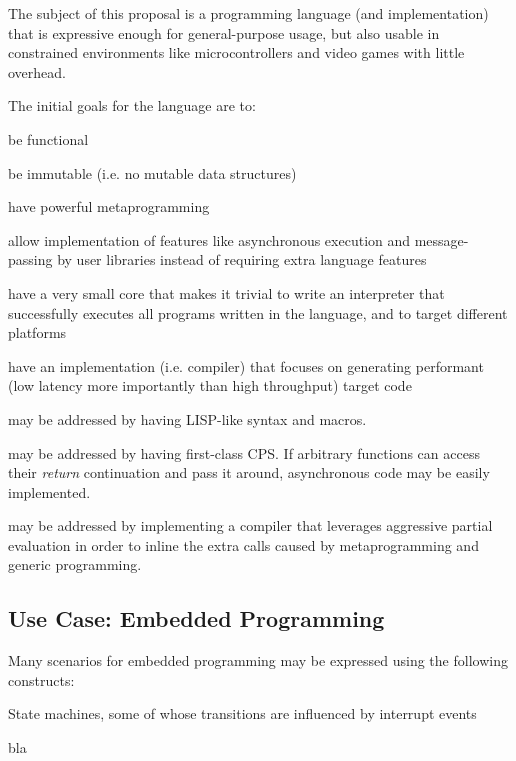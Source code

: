 \documentclass[main.tex]{subfiles}
\begin{document}
The subject of this proposal is a programming language (and implementation)
that is expressive enough for general-purpose usage, but also usable
in constrained environments like microcontrollers and video games with little
overhead.

The initial goals for the language are to:
\begin{menumerate}
    \item\label{functional} be functional
    \item\label{immutable} be immutable (i.e. no mutable data structures)
    \item\label{metaprogramming} have powerful metaprogramming
    \item\label{allows-async} allow implementation of features like asynchronous
    execution and message-passing by user libraries instead of requiring
    extra language features
    \item\label{simple} have a very small core that makes it trivial to
    write an interpreter that successfully executes all programs written
    in the language, and to target different platforms
    \item\label{performant} have an implementation (i.e. compiler) that
    focuses on generating performant (low latency more importantly than
    high throughput) target code
\end{menumerate}

 may be addressed by having LISP-like syntax
and macros.

 may be addressed by having first-class CPS.
If arbitrary functions can access their \emph{return} continuation
and pass it around, asynchronous code may be easily implemented.

 may be addressed by implementing a compiler that leverages
aggressive partial evaluation in order to inline the extra calls caused by
metaprogramming and generic programming.

\subsection{Use Case: Embedded Programming}

Many scenarios for embedded programming may be expressed using
the following constructs:
\begin{mitemize}
    \item State machines, some of whose transitions are influenced
    by interrupt events
    \item bla
\end{mitemize}
\end{document}
